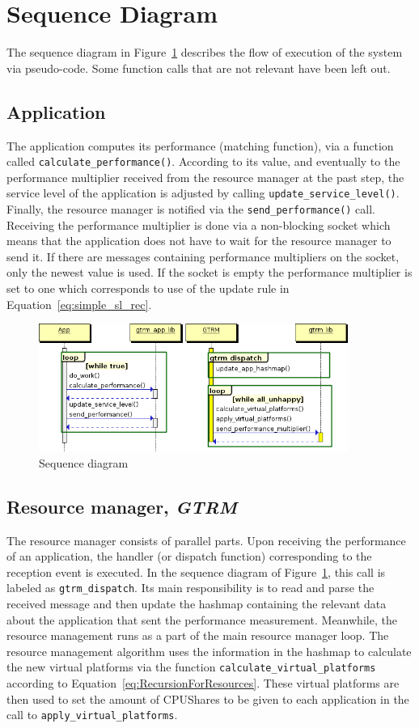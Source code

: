 \documentclass[nobiblatex]{LTHthesis}
\begin{document}
\section{Sequence Diagram}

The sequence diagram in Figure~\ref{fig:sdiag} describes the flow of 
execution of the system via pseudo-code. Some function calls that are 
not relevant have been left out. 
\subsection{Application}
The application computes its performance (matching function), via a 
function called \texttt{calculate\_performance()}. According to its value,
and eventually to the performance multiplier received from the resource
manager at the past step, the service level of the application is adjusted by
calling \texttt{update\_service\_level()}. Finally, the resource manager
is notified via the \texttt{send\_performance()} call. 
Receiving the performance multiplier is done via a non-blocking socket which
means that the application does not have to wait for the resource manager to 
send it. If there are messages containing performance multipliers on the 
socket, only the newest value is used. If the socket is
empty the performance multiplier is set to one which corresponds to use of the 
update rule in Equation~\ref{eq:simple_sl_rec}.

\begin{figure}[t]
	\centering
	\includegraphics[width=0.9\textwidth]{diag.png}
	\caption{Sequence diagram}
	\label{fig:sdiag}
\end{figure}

\subsection{Resource manager, \emph{GTRM}}
The resource manager consists of parallel parts. Upon receiving the
performance of an application, the handler (or dispatch function)
corresponding to the reception event is executed. In the sequence diagram of
Figure~\ref{fig:sdiag}, this call is labeled as \texttt{gtrm\_dispatch}.
Its main responsibility is to read and parse the received message and 
then update the hashmap containing the relevant data about the application
that sent the performance measurement. Meanwhile, the resource management 
runs as a part of the main resource manager loop. The resource management
algorithm uses the information in the hashmap to calculate the new virtual
platforms via the function \texttt{calculate\_virtual\_platforms} according
to Equation~\ref{eq:RecursionForResources}.
These virtual platforms are then used to set the amount of CPUShares to
be given to each application in the call to \texttt{apply\_virtual\_platforms}.
\end{document}

